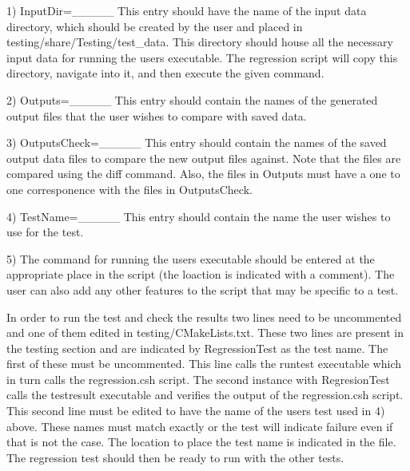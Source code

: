 1) Input\+Dir=\+\_\+\+\_\+\+\_\+\+\_\+\+\_\+ This entry should have the name of the input data directory, which should be created by the user and placed in testing/share/\+Testing/test\+\_\+data. This directory should house all the necessary input data for running the user\textquotesingle{}s executable. The regression script will copy this directory, navigate into it, and then execute the given command.

2) Outputs=\+\_\+\+\_\+\+\_\+\+\_\+\+\_\+ This entry should contain the names of the generated output files that the user wishes to compare with saved data.

3) Outputs\+Check=\+\_\+\+\_\+\+\_\+\+\_\+\+\_\+ This entry should contain the names of the saved output data files to compare the new output files against. Note that the files are compared using the diff command. Also, the files in Outputs must have a one to one corresponence with the files in Outputs\+Check.

4) Test\+Name=\+\_\+\+\_\+\+\_\+\+\_\+\+\_\+ This entry should contain the name the user wishes to use for the test.

5) The command for running the user\textquotesingle{}s executable should be entered at the appropriate place in the script (the loaction is indicated with a comment). The user can also add any other features to the script that may be specific to a test.

In order to run the test and check the results two lines need to be uncommented and one of them edited in testing/\+C\+Make\+Lists.\+txt. These two lines are present in the testing section and are indicated by Regression\+Test as the test name. The first of these must be uncommented. This line calls the runtest executable which in turn calls the regression.\+csh script. The second instance with Regresion\+Test calls the testresult executable and verifies the output of the regression.\+csh script. This second line must be edited to have the name of the user\textquotesingle{}s test used in 4) above. These names must match exactly or the test will indicate failure even if that is not the case. The location to place the test name is indicated in the file. The regression test should then be ready to run with the other tests.

